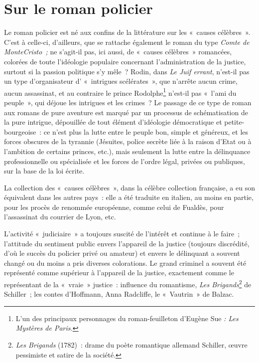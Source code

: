 \documentclass[french,twoside]{book} %
\begin{document}
\section[{Sur le roman policier}]{Sur le roman policier}
\noindent Le roman policier est né aux confins de la littérature sur les « causes célèbres ». C'est à celle-ci, d’ailleurs, que se rattache également le roman du type \emph{Comte de MonteCristo ;} ne s’agit-il pas, ici aussi, de « causes célèbres » romancées, colorées de toute l’idéologie populaire concernant l’administration de la justice, surtout si la passion politique s’y mêle ? Rodin, dans \emph{Le Juif errant}, n’est-il pas un type d’organisateur d’ « intrigues scélérates », que n’arrête aucun crime, aucun assassinat, et au contraire le prince Rodolphe\footnote{L'un des principaux personnages du roman-feuilleton d’Eugène Sue \emph{: Les Mystères de Paris.}} n’est-il pas « l’ami du peuple », qui déjoue les intrigues et les crimes ? Le passage de ce type de roman aux romans de pure aventure est marqué par un processus de schématisation de la pure intrigue, dépouillée de tout élément d’idéologie démocratique et petite-bourgeoise : ce n’est plus la lutte entre le peuple bon, simple et généreux, et les forces obscures de la tyrannie (Jésuites, police secrète liée à la raison d’Etat ou à l’ambition de certains princes, etc.), mais seulement la lutte entre la délinquance professionnelle ou spécialisée et les forces de l’ordre légal, privées ou publiques, sur la base de la loi écrite.\par
La collection des « causes célèbres », dans la célèbre collection française, a eu son équivalent dans les autres pays : elle a été traduite en italien, au moins en partie, pour les procès de renommée européenne, comme celui de Fualdès, pour l’assassinat du courrier de Lyon, etc.\par
L'activité « judiciaire » a toujours suscité de l’intérêt et continue à le faire ; l’attitude du sentiment public envers l’appareil de la justice (toujours discrédité, d’où le succès du policier privé ou amateur) et envers le délinquant a souvent changé ou du moins a pris diverses colorations. Le grand criminel a souvent été représenté comme supérieur à l’appareil de la justice, exactement comme le représentant de la « vraie » justice : influence du romantisme, \emph{Les Brigands}\footnote{\emph{Les Brigands} (1782) : drame du poète romantique allemand Schiller, œuvre pessimiste et satire de la société.} de Schiller ; les contes d’Hoffmann, Anna Radcliffe, le « Vautrin » de Balzac.\par
\end{document}
